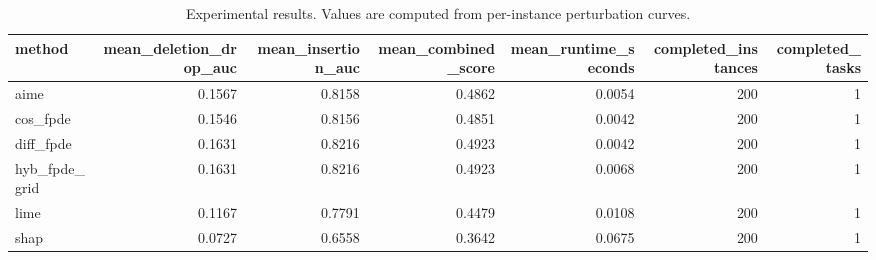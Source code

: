 \begin{table}[t]
\caption{Experimental results. Values are computed from per-instance perturbation curves.}
\label{tab:main_results_computed}
\centering
\begin{tabular}{lrrrrrr}
\toprule
method & mean\_deletion\_drop\_auc & mean\_insertion\_auc & mean\_combined\_score & mean\_runtime\_seconds & completed\_instances & completed\_tasks \\
\midrule
aime & 0.1567 & 0.8158 & 0.4862 & 0.0054 & 200 & 1 \\
cos\_fpde & 0.1546 & 0.8156 & 0.4851 & 0.0042 & 200 & 1 \\
diff\_fpde & 0.1631 & 0.8216 & 0.4923 & 0.0042 & 200 & 1 \\
hyb\_fpde\_grid & 0.1631 & 0.8216 & 0.4923 & 0.0068 & 200 & 1 \\
lime & 0.1167 & 0.7791 & 0.4479 & 0.0108 & 200 & 1 \\
shap & 0.0727 & 0.6558 & 0.3642 & 0.0675 & 200 & 1 \\
\bottomrule
\end{tabular}

\end{table}
